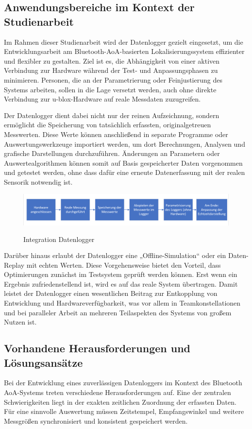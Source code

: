 \documentclass[a4paper, 12pt]{article} %
\begin{document}
\subsection{Anwendungsbereiche im Kontext der Studienarbeit}
Im Rahmen dieser Studienarbeit wird der Datenlogger gezielt eingesetzt, um die Entwicklungsarbeit am Bluetooth-\ac{AoA}-basierten
 Lokalisierungssystem effizienter und flexibler zu gestalten. Ziel ist es, die Abhängigkeit von einer aktiven Verbindung zur 
 Hardware während der Test- und Anpassungsphasen zu minimieren. Personen, die an der Parametrierung oder Feinjustierung des Systems
  arbeiten, sollen in die Lage versetzt werden, auch ohne direkte Verbindung zur u-blox-Hardware auf reale Messdaten zuzugreifen.

Der Datenlogger dient dabei nicht nur der reinen Aufzeichnung, sondern ermöglicht die Speicherung von tatsächlich erfassten, 
originalgetreuen Messwerten. Diese Werte können anschließend in separate Programme oder Auswertungswerkzeuge importiert werden,
 um dort Berechnungen, Analysen und grafische Darstellungen durchzuführen. Änderungen an Parametern oder Auswertealgorithmen können 
 somit auf Basis gespeicherter Daten vorgenommen und getestet werden, ohne dass dafür eine erneute Datenerfassung mit der realen Sensorik notwendig ist.

\begin{figure}[H]
    \includegraphics[width=1\linewidth]{images/Flussdiagramm Datenlogger.png}\\[1ex]
    \centering
    \caption{Integration Datenlogger}
    \label{ABBILDUNG}
\end{figure}

Darüber hinaus erlaubt der Datenlogger eine „Offline-Simulation“ oder ein Daten-Replay mit echten Werten. Diese Vorgehensweise bietet den 
Vorteil, dass Optimierungen zunächst im Testsystem geprüft werden können. Erst wenn ein Ergebnis zufriedenstellend ist, wird es auf das reale 
System übertragen. Damit leistet der Datenlogger einen wesentlichen Beitrag zur Entkopplung von Entwicklung und Hardwareverfügbarkeit, 
was vor allem in Teamkonstellationen und bei paralleler Arbeit an mehreren Teilaspekten des Systems von großem Nutzen ist.

\subsection{Vorhandene Herausforderungen und Lösungsansätze}
Bei der Entwicklung eines zuverlässigen Datenloggers im Kontext des Bluetooth \ac{AoA}-Systems treten verschiedene Herausforderungen auf. 
Eine der zentralen Schwierigkeiten liegt in der exakten zeitlichen Zuordnung der erfassten Daten. Für eine sinnvolle Auswertung müssen 
Zeitstempel, Empfangswinkel und weitere Messgrößen synchronisiert und konsistent gespeichert werden.
\end{document}

